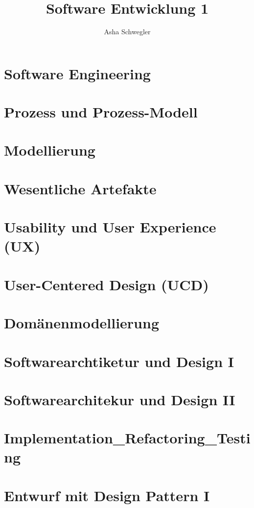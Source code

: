 \documentclass{article}
\title{Software Entwicklung 1}
\author{Asha Schwegler}
\begin{document}
\maketitle
\tableofcontents
\newpage


\section{Software Engineering}





\section{Prozess und Prozess-Modell}



\section{Modellierung}


\section{Wesentliche Artefakte}



\section{Usability und User Experience (UX)}


\section{User-Centered Design (UCD)}




\section{Domänenmodellierung}




\section{Softwarearchtiketur und Design I}


\section{Softwarearchitekur und Design II}


\section{Implementation_Refactoring_Testing}





\section{Entwurf mit Design Pattern I}

\end{document}
